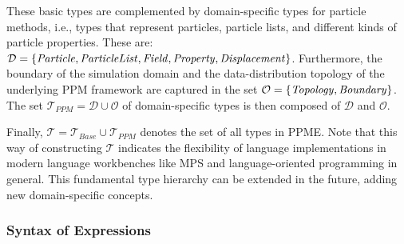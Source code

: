   These basic types are complemented by domain-specific types for particle methods,
  i.e., types that represent particles, particle lists, and different kinds of particle
  properties. These are:
  $\mathcal{D} = \{ \TP{Particle}, \TP{ParticleList}, \TP{Field}, \TP{Property},
  \TP{Displacement} \}$.
  Furthermore, the boundary of the simulation domain and the data-distribution topology of the underlying PPM framework are captured in the set $\mathcal{O}=\{ \TP{Topology}, \TP{Boundary} \}$. The set
  $\mathcal{T}_\mathit{PPM} = \mathcal{D} \cup \mathcal{O}$ of domain-specific types
  is then composed of $\mathcal{D}$ and $\mathcal{O}$.

  Finally, $\mathcal{T} = \mathcal{T}_{Base} \cup \mathcal{T}_{PPM}$ denotes the set
  of all types in PPME. Note that this way of constructing $\mathcal{T}$ indicates the
  flexibility of language implementations in modern language workbenches like MPS and
  language-oriented programming in general. This fundamental type hierarchy can be
  extended in the future, adding new domain-specific concepts.


\subsubsection{Syntax of Expressions} %
\label{sub:syntax_of_expressions}


